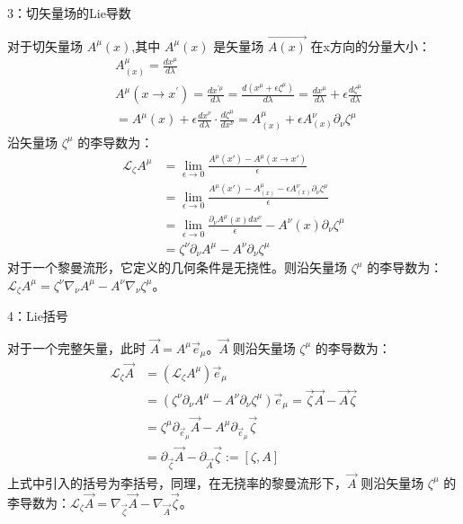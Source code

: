 3：切矢量场的Lie导数

对于切矢量场 $A^{\mu}(x)$,其中 $A^{\mu}(x)$ 是矢量场 $\overrightarrow{A(x)}$ 在x方向的分量大小：
$$\begin{aligned}
&A^{\mu}_{(x)}=\frac{d x^{\mu}}{d \lambda}\\
&A^{\mu}\left(x \rightarrow x^{\prime}\right)=\frac{d x^{\prime \mu}}{d \lambda}=\frac{d\left(x^{\mu}+\epsilon \zeta^{\mu}\right)}{d \lambda}=\frac{d x^{\mu}}{d \lambda}+\epsilon\frac{d \zeta^{\mu}}{d \lambda} \\
&=A^{\mu}(x)+\epsilon \frac{d x^{\nu}}{d \lambda} \cdot \frac{d \zeta^{\mu}}{dx^{\nu}} =A^{\mu}_{(x)}+\epsilon A_{(x)}^{\nu}\partial_{\nu}\zeta^{\mu}
\end{aligned}$$
沿矢量场 $\zeta^{\mu}$ 的李导数为：
$$\begin{aligned}
\mathcal{L}_{\zeta} A^{\mu} &=\lim _{\epsilon \rightarrow 0} \frac{A^{\mu}(x')-A^{\mu}(x \rightarrow x')}{\epsilon} \\
&=\lim _{\epsilon \rightarrow 0} \frac{A^{\mu}(x')-A^{\mu}_{(x)}-\epsilon A_{(x)}^{\nu}\partial_{\nu}\zeta^{\mu}}{\epsilon} \\
&=\lim _{\epsilon \rightarrow 0} \frac{\partial_{\nu} A^{\mu}(x) d x^{\nu}}{\epsilon}-A^{\nu}(x) \partial_{\nu} \zeta^{\mu} \\
&=\zeta^{\nu} \partial_{\nu} A^{\mu}-A^{\nu} \partial_{\nu} \zeta^{\mu}
\end{aligned}$$
对于一个黎曼流形，它定义的几何条件是无挠性。则沿矢量场 $\zeta^{\mu}$ 的李导数为：$\mathcal{L}_{\zeta} A^{\mu}=\zeta^{\nu} \nabla_{\nu} A^{\mu}-A^{\nu} \nabla_{\nu} \zeta^{\mu}$。

 4：Lie括号

对于一个完整矢量，此时 $\overrightarrow{A}=A^{\mu}\overrightarrow{e}_{\mu}$。$\overrightarrow{A}$ 则沿矢量场 $\zeta^{\mu}$ 的李导数为：
$$\begin{aligned}
\mathcal{L}_{\zeta} \overrightarrow{A} &=\left(\mathcal{L}_{\zeta} A^{\mu}\right)\overrightarrow{e}_{\mu}  \\
&=\left(\zeta^{\nu} \partial_{\nu} A^{\mu}-A^{\nu} \partial_{\nu} \zeta^{\mu}\right) \overrightarrow{e}_{\mu} =\overrightarrow{\zeta} \overrightarrow{A}-\overrightarrow{A} \overrightarrow{\zeta} \\
&=\zeta^{\mu} \partial_{\overrightarrow{e}_{\mu}} \overrightarrow{A}-A^{\mu} \partial_{\overrightarrow{e}_{\mu}} \overrightarrow{\zeta}\\
&=\partial_{\overrightarrow{\zeta}} \overrightarrow{A}-\partial_{\overrightarrow{A}} \overrightarrow{\zeta}:=[\zeta, A]
\end{aligned}$$
上式中引入的括号为李括号，同理，在无挠率的黎曼流形下，$\overrightarrow{A}$ 则沿矢量场 $\zeta^{\mu}$ 的李导数为：$\mathcal{L}_{\zeta} \overrightarrow{A}=\nabla_{\overrightarrow{\zeta}} \overrightarrow{A}-\nabla_{\overrightarrow{A}} \overrightarrow{\zeta}$。

